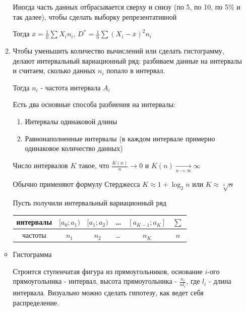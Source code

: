 \documentclass[12pt]{article}
\begin{document}
\begin{enumerate}
\begin{enumerate}
        Иногда часть данных отбрасывается сверху и снизу (по 5, по 10, по 5\% и так далее), чтобы сделать выборку репрезентативной

        Тогда $\overline{x} = \frac{1}{n} \sum X_i n_i$, $D^* = \frac{1}{n} \sum (X_i - \overline{x})^2 n_i$
        
        \item Чтобы уменьшить количество вычислений или сделать гистограмму, делают интервальный вариационный ряд: 
        разбиваем данные на интервалы и считаем, сколько данных $n_i$ попало в интервал. 

        Тогда $n_i$ - частота интервала $A_i$

        Есть два основные способа разбиения на интервалы: 

        \begin{enumerate}
            \item Интервалы одинаковой длины
            \item Равнонаполненные интервалы (в каждом интервале примерно одинаковое количество данных)
        \end{enumerate}

        Число интервалов $K$ такое, что $\frac{K(n)}{n} \longrightarrow 0$ и $K(n) \underset{n \to \infty}{\longrightarrow} \infty$

        Обычно применяют формулу Стерджесса $K \approx 1 + \log_2 n$ или $K \approx \sqrt[3]{n}$

        Пусть получили интервальный вариационный ряд

        \begin{tabular}{c|c|c|c|c|c}
            интервалы & $[a_0; a_1)$ & $[a_1; a_2)$ & \dots & $[a_{K - 1}; a_K]$ & $\sum$ \\ 
            \hline
            частоты & $n_1$ & $n_2$ & \dots & $n_K$ & $n$ \\ 
        \end{tabular}
    \end{enumerate}

    \smallvspace
        
    \begin{multicols}{2}
        \begin{itemize}
            \item Гистограмма

            Строится ступенчатая фигура из прямоугольников, основание $i$-ого прямоугольника - интервал, 
            высота прямоугольника - $\frac{n_i}{n l_i}$, где $l_i$ - длина интервала. 
            Визуально можно сделать гипотезу, как ведет себя распределение. 


\end{itemize}
\end{multicols}
\end{enumerate}
\end{document}
